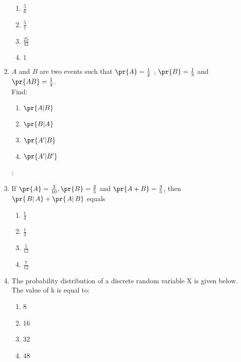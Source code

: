 \begin{enumerate}[label=\thesection.\arabic*,ref=\thesection.\theenumi]
\begin{enumerate}[label=(\Alph*)]
\item 
$\frac{5}{6}$\\
\item 
$\frac{5}{7}$\\
\item 
$\frac{25}{42}$\\
\item 
$1$
%
\end{enumerate}
\item $A$ and $B$ are two events such that $\pr{A}= \frac{1}{2}$ , $\pr{B}= \frac{1}{3}$ and $\pr{AB}= \frac{1}{4}$.\\
Find:
\begin{enumerate}[label =\roman*]
\item $\pr{A|B}$  \item $\pr{B|A}$  \item $\pr{A^{\prime}|B}$  \item $\pr{A^{\prime}|B^{\prime}}$
\end{enumerate}
\solution:\\
%
\item If $\pr{A} = \frac{3}{10}, \pr{B} = \frac{2}{5}$ and $\pr{A+B} = \frac{3}{5}$, then $\pr{\left. B \right| A} + \pr{\left. A \right| B} $ equals
\begin{enumerate}
	\item $\frac{1}{4}$ \vspace{2pt}
	\item $\frac{1}{3}$ \vspace {2pt}
	\item $\frac{5}{12}$ \vspace{2pt}
	\item $\frac{7}{12}$ \vspace{2pt}
\end{enumerate}
%
\item The probability distribution of a discrete random variable X is given below. The value of k is equal to:
\begin{table}[!ht]
%
\end{table}
\begin{enumerate}[label=(\alph*)]
\item 8
\item 16
\item 32
\item 48
\end{enumerate}

\end{enumerate}
